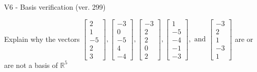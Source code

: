 \begin{exercise}
  \begin{exerciseTitle}V6 - Basis verification (ver. 299)\end{exerciseTitle}
  \begin{exerciseStatement}
    Explain why the vectors \(\left[\begin{array}{r}
2 \\
1 \\
-5 \\
2 \\
3
\end{array}\right] , \left[\begin{array}{r}
-3 \\
0 \\
-5 \\
4 \\
-4
\end{array}\right] , \left[\begin{array}{r}
-3 \\
2 \\
2 \\
0 \\
2
\end{array}\right] , \left[\begin{array}{r}
1 \\
-5 \\
-4 \\
-1 \\
-3
\end{array}\right] , \text{ and } \left[\begin{array}{r}
-3 \\
2 \\
1 \\
-3 \\
1
\end{array}\right]\) are or are not a basis of \(\mathbb{R}^5\)	



\end{exerciseStatement}
\end{exercise}
